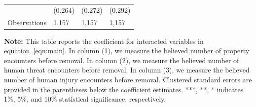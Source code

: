 \documentclass[english,12pt]{article}
\begin{document}
\begin{table}[H]
\begin{tabular}{@{}llll@{}}
                    &     (0.264)   &     (0.272)   &     (0.292)   \\
        Observations & 1,157    &  1,157       & 1,157        \\\bottomrule
    \end{tabular}
    \begin{minipage}{.9\textwidth}
        \vspace{1em}
    \footnotesize{{\bf{Note:}} This table reports the coefficient for interacted variables in equation~\ref{eqn:main}. In column (1), we measure the believed number of property encounters before removal. In column (2), we measure the believed number of human threat encounters before removal. In column (3), we measure the believed number of human injury encounters before removal. Clustered standard errors are provided in the parentheses below the coefficient estimates. ***, **, * indicates 1\%, 5\%, and 10\% statistical significance, respectively.}
    \label{tab: bel_int}
    \end{minipage}
\end{table}
\end{document}
